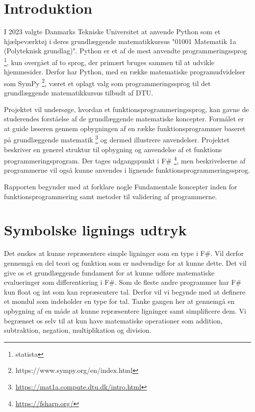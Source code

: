 \documentclass{article}
\begin{document}

\tableofcontents
\newpage
\section{Introduktion}


I 2023 valgte Danmarks Tekniske Universitet at anvende Python som et hjælpeværktøj i deres grundlæggende matematikkursus "01001 Matematik 1a (Polyteknisk grundlag)". Python er et af de mest anvendte programmeringssprog \footnote{statista}, kun overgået af to sprog, der primært bruges sammen til at udvikle hjemmesider. Derfor har Python, med en række matematiske programudvidelser som SymPy \footnote{https://www.sympy.org/en/index.html}, været et oplagt valg som programmeringssprog til det grundlæggende matematikkursus tilbudt af DTU.

Projektet vil undersøge, hvordan et funktionsprogrammeringssprog, kan gavne de studerendes forståelse af de grundlæggende matematiske koncepter. Formålet er at guide læseren gennem opbygningen af en række funktionsprogrammer baseret på grundlæggende matematik \footnote{\url{https://mat1a.compute.dtu.dk/intro.html}} og dermed illustrere anvendelser. Projektet beskriver en generel struktur til opbygning og anvendelse af et funktions programmeringsprogram. Der tages udgangspunkt i F\# \footnote{\url{https://fsharp.org/}}, men beskrivelserne af programmerne vil også kunne anvendes i lignende funktionsprogrammeringssprog.

Rapporten begynder med at forklare nogle Fundamentale koncepter inden for funktionsprogrammering samt metoder til validering af programmerne. 



\section{Symbolske lignings udtryk}
Det ønskes at kunne repræsentere simple ligninger som en type i F\#. Vil derfor gennemgå en del teori og funktion som er nødvendige for at kunne dette. Det vil give os et grundlæggende fundament for at kunne udføre matematiske evalueringer som differentiering i F\#. Som de fleste andre programmer har F\# kun float og int som kan repræsentere tal. Derfor vil vi begynde med at definere et mondul som indeholder en type for tal. Tanke gangen her at gennemgå en opbygning af en måde at kunne repræsentere ligninger samt simplificere dem. Vi begrænset os selv til at kun have matematiske operationer som addition, subtraktion, negation, multiplikation og division.
\end{document}

